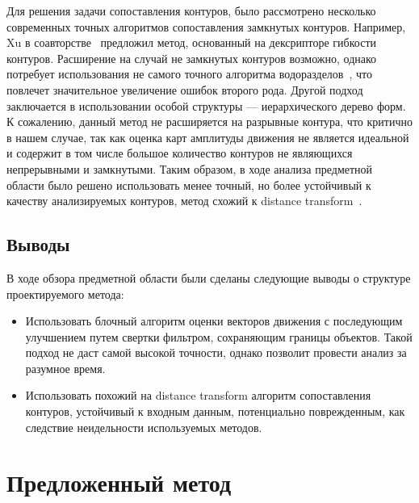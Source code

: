 \documentclass[14pt, a4paper]{extarticle}
\begin{document}
Для решения задачи сопоставления контуров, было рассмотрено несколько современных точных алгоритмов
сопоставления замкнутых контуров. Например, Xu в соавторстве~\cite{xu20092d} предложил метод,
основанный на дексрипторе гибкости контуров. Расширение на случай не замкнутых контуров возможно, 
однако потребует использования не самого точного алгоритма водоразделов~\cite{roerdink2000watershed}, что повлечет значительное увеличение ошибок второго рода. Другой 
подход~\cite{felzenszwalb2007hierarchical} заключается в использовании особой структуры ---
иерархического дерево форм. К сожалению, данный метод не расширяется на разрывные контура, 
что критично в нашем случае, так как оценка карт амплитуды движения не является идеальной и содержит
в том числе большое количество контуров не являющихся непрерывными и замкнутыми. Таким образом, 
в ходе анализа предметной области было решено использовать менее точный, но более устойчивый
к качеству анализируемых контуров, метод схожий к distance transform~\cite{borgefors1986distance}.

\subsection{Выводы}

В ходе обзора предметной области были сделаны следующие выводы о структуре проектируемого метода:

\begin{itemize}
	\item Использовать блочный алгоритм оценки векторов движения с последующим улучшением
	путем свертки фильтром, сохраняющим границы объектов. Такой подход не даст самой высокой 
	точности, однако позволит провести анализ за разумное время.
	\item Использовать похожий на distance transform алгоритм сопоставления контуров, устойчивый
	к входным данным, потенциально поврежденным, как следствие неидельности используемых методов.
\end{itemize}

\newpage
\section{Предложенный метод}





\end{document}
